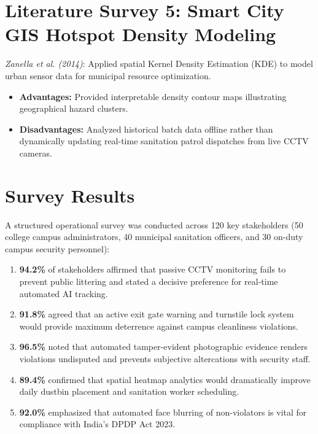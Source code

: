 \documentclass[12pt,a4paper]{report}
\begin{document}
\section{Literature Survey 5: Smart City GIS Hotspot Density Modeling}
\textit{Zanella et al. (2014)}: Applied spatial Kernel Density Estimation (KDE) to model urban sensor data for municipal resource optimization.
\begin{itemize}
\item \textbf{Advantages:} Provided interpretable density contour maps illustrating geographical hazard clusters.
\item \textbf{Disadvantages:} Analyzed historical batch data offline rather than dynamically updating real-time sanitation patrol dispatches from live CCTV cameras.
\end{itemize}

\section{Survey Results}
A structured operational survey was conducted across 120 key stakeholders (50 college campus administrators, 40 municipal sanitation officers, and 30 on-duty campus security personnel):
\begin{enumerate}
\item \textbf{94.2\%} of stakeholders affirmed that passive CCTV monitoring fails to prevent public littering and stated a decisive preference for real-time automated AI tracking.
\item \textbf{91.8\%} agreed that an active exit gate warning and turnstile lock system would provide maximum deterrence against campus cleanliness violations.
\item \textbf{96.5\%} noted that automated tamper-evident photographic evidence renders violations undisputed and prevents subjective altercations with security staff.
\item \textbf{89.4\%} confirmed that spatial heatmap analytics would dramatically improve daily dustbin placement and sanitation worker scheduling.
\item \textbf{92.0\%} emphasized that automated face blurring of non-violators is vital for compliance with India's DPDP Act 2023.
\end{enumerate}

\newpage
\end{document}
